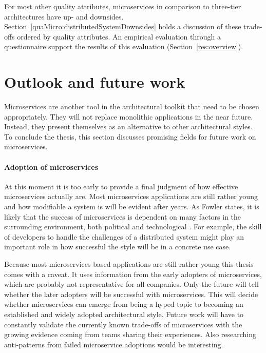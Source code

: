 For most other quality attributes, microservices in comparison to three-tier architectures have up- and downsides.
Section~\ref{quaMicro:distributedSystemDownsides} holds a discussion of these trade-offs ordered by quality attributes.
An empirical evaluation through a questionnaire support the results of this evaluation (Section~\ref{res:overview}).

\section{Outlook and future work}
Microservices are another tool in the architectural toolkit that need to be chosen appropriately.
They will not replace monolithic applications in the near future.
Instead, they present themselves as an alternative to other architectural styles.
To conclude the thesis, this section discusses promising fields for future work on microservices.

\paragraph{Adoption of microservices}
At this moment it is too early to provide a final judgment of how effective microservices actually are. 
Most microservices applications are still rather young and how modifiable a system is will be evident after years.
As Fowler states, it is likely that the success of microservices is dependent on many factors in the surrounding environment, both political and technological \cite{FowlerMSOverview}.
For example, the skill of developers to handle the challenges of a distributed system might play an important role in how successful the style will be in a concrete use case.

Because most microservices-based applications are still rather young this thesis comes with a caveat. 
It uses information from the early adopters of microservices, which are probably not representative for all companies.
Only the future will tell whether the later adopters will be successful with microservices.
This will decide whether microservices can emerge from being a hyped topic to becoming an established and widely adopted architectural style.
Future work will have to constantly validate the currently known trade-offs of microservices with the growing evidence coming from teams sharing their experiences.
Also researching anti-patterns from failed microservice adoptions would be interesting.

